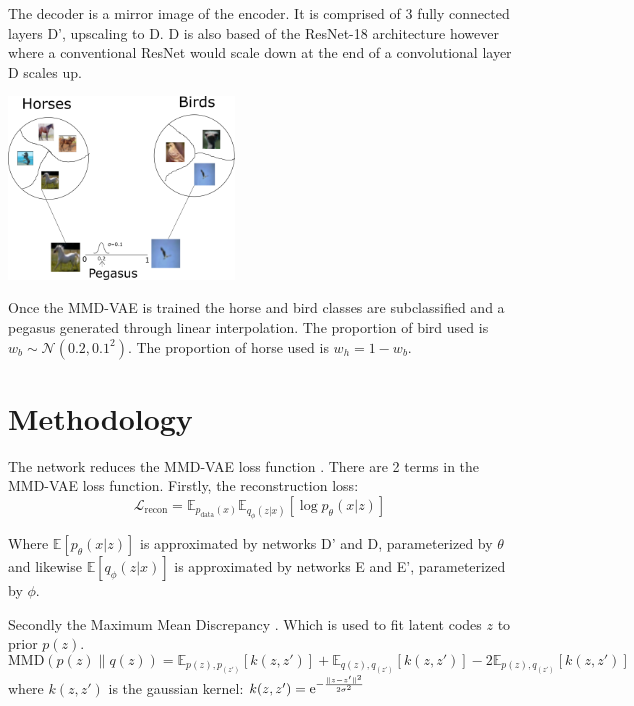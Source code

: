 \documentclass{article}
\begin{document}
The decoder is a mirror image of the encoder. It is comprised of 3 fully connected layers D', upscaling to D. D is also based of the ResNet-18 architecture however where a conventional ResNet would scale down at the end of a convolutional layer D scales up.



\begin{center}
    \includegraphics[width=0.45\textwidth]{figures/clustering.png}
\end{center}

Once the MMD-VAE is trained the horse and bird classes are subclassified and a pegasus generated through linear interpolation. The proportion of bird used is $w_b \sim \mathcal{N}(0.2, 0.1^2)$. The proportion of horse used is $w_h = 1-w_b$.

\section{Methodology}
The network reduces the MMD-VAE loss function \cite{infovae}. 
There are 2 terms in the MMD-VAE loss function. Firstly, the reconstruction loss:
\begin{equation}
    \mathcal{L}_{\textrm{recon}} = \mathbb{E}_{p_{\textrm{data}}(x)} \mathbb{E}_{q_\phi (z|x)} [\log p_\theta(x|z)]
\end{equation}

Where $\mathbb{E}[p_\theta(x|z)]$ is approximated by networks D' and D, parameterized by $\theta$ and likewise $\mathbb{E}[q_\phi(z|x)]$ is approximated by networks E and E', parameterized by $\phi$.


Secondly the Maximum Mean Discrepancy \cite{mmd}. Which is used to fit latent codes $z$ to prior $p(z)$.
\begin{equation}
    \textrm{MMD}(p(z) \lVert q(z)) = \mathbb{E}_{p(z), p_(z')}[k(z, z')] + \mathbb{E}_{q(z), q_(z')}[k(z, z')] - 2 \mathbb{E}_{p(z), q_(z')}[k(z, z')]
\end{equation}
where $k(z, z')$ is the gaussian kernel: $k(z, z')={\rm e}^{-\frac{\lVert z-z' \rVert^2}{2\sigma^2}}$
\end{document}
